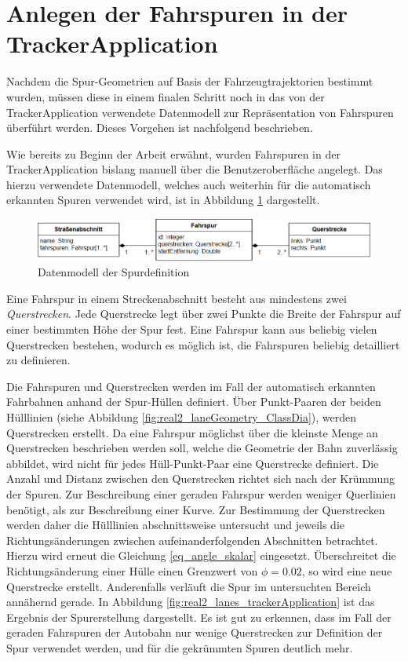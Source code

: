 \section{Anlegen der Fahrspuren in der TrackerApplication}

Nachdem die Spur-Geometrien auf Basis der Fahrzeugtrajektorien bestimmt wurden, müssen diese in einem
finalen Schritt noch in das von der TrackerApplication verwendete Datenmodell zur Repräsentation von
Fahrspuren überführt werden. Dieses Vorgehen ist nachfolgend beschrieben.

Wie bereits zu Beginn der Arbeit erwähnt, wurden Fahrspuren in der TrackerApplication bislang manuell
über die Benutzeroberfläche angelegt. Das hierzu verwendete Datenmodell, welches auch weiterhin für die
automatisch erkannten Spuren verwendet wird, ist in Abbildung \ref{fig:real2_lane_datamodell} dargestellt.

\begin{figure}[H]
    \centering
    \includegraphics[align=c, width=0.85\linewidth]{resources/img/umsetzung/U2/Fahrspurmodell}
    \caption{Datenmodell der Spurdefinition}
    \label{fig:real2_lane_datamodell}
\end{figure}

Eine Fahrspur in einem Streckenabschnitt besteht aus mindestens zwei \textit{Querstrecken}. Jede Querstrecke
legt über zwei Punkte die Breite der Fahrspur auf einer bestimmten Höhe der Spur fest. Eine Fahrspur
kann aus beliebig vielen Querstrecken bestehen, wodurch es möglich ist, die Fahrspuren beliebig detailliert
zu definieren.

Die Fahrspuren und Querstrecken werden im Fall der automatisch erkannten Fahrbahnen anhand der Spur-Hüllen
definiert. Über Punkt-Paaren der beiden Hülllinien (siehe Abbildung \ref{fig:real2_laneGeometry_ClassDia}),
werden Querstrecken erstellt. 
Da eine Fahrspur möglichst über die kleinste Menge an Querstrecken beschrieben werden soll, welche die
Geometrie der Bahn zuverlässig abbildet, wird nicht für jedes Hüll-Punkt-Paar eine Querstrecke definiert.
Die Anzahl und Distanz zwischen den Querstrecken richtet sich nach der Krümmung der Spuren. Zur Beschreibung
einer geraden Fahrspur werden weniger Querlinien benötigt, als zur Beschreibung einer Kurve.
Zur Bestimmung der Querstrecken werden daher die Hülllinien abschnittsweise untersucht und jeweils
die Richtungsänderungen zwischen aufeinanderfolgenden Abschnitten betrachtet. Hierzu wird erneut
die Gleichung \ref{eq_angle_skalar} eingesetzt.
Überschreitet die Richtungsänderung einer Hülle einen Grenzwert von $\phi = 0.02$, so wird eine neue
Querstrecke erstellt. Anderenfalls verläuft die Spur im untersuchten Bereich annähernd gerade.
In Abbildung \ref{fig:real2_lanes_trackerApplication} ist das Ergebnis der Spurerstellung dargestellt.
Es ist gut zu erkennen, dass im Fall der geraden Fahrspuren der Autobahn nur wenige Querstrecken zur
Definition der Spur verwendet werden, und für die gekrümmten Spuren deutlich mehr.

